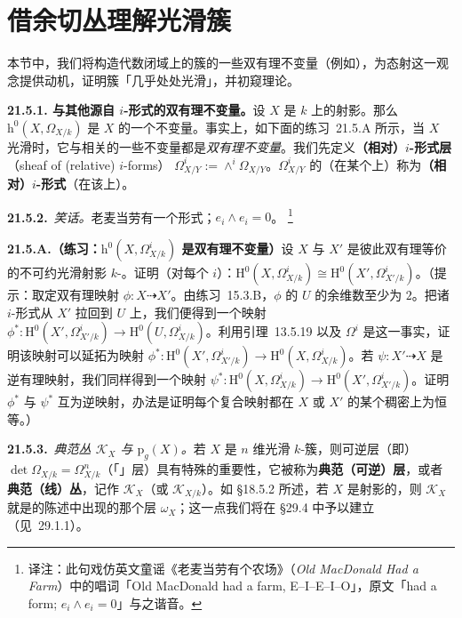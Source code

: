 
\section{借余切丛理解光滑簇}

本节中，我们将构造代数闭域上的簇的一些双有理不变量（例如\trGeometricGenus），为\trUnramified{}态射这一观念提供动机，证明簇「几乎处处光滑」，并初窥\trHodge{}理论。

\textbf{21.5.1. \trGeometricGenus{}与其他源自 $i$-形式的双有理不变量。}\quad 设 $X$ 是 $k$ 上的射影\trScheme。那么 $\mathrm{h}^0(X,\Omega_{X/k})$ 是 $X$ 的一个不变量。事实上，如下面的\mbox{练习~21.5.A} 所示，当 $X$ 光滑时，它与相关的一些不变量都是\emph{双有理不变量}。我们先定义\textbf{（相对）$i$-形式层}（sheaf of (relative) $i$-forms）%
$\Omega^i_{X/Y}:=\wedge^i\Omega_{X/Y}$。$\Omega^i_{X/Y}$ 的\trSection（在某个\trOpenSet{}上）称为\textbf{（相对）$i$-形式}（在该\trOpenSet{}上）。

\textbf{21.5.2.}\ \emph{笑话。}\quad 老麦当劳有一个形式；$e_i\wedge e_i=0$。%
\footnote{译注：此句戏仿英文童谣《老麦当劳有个农场》（\emph{Old MacDonald Had a Farm}）中的唱词「Old MacDonald had a farm, E--I--E--I--O」，原文「had a form; $e_i\wedge e_i=0$」与之谐音。}

\textbf{21.5.A.（练习：$\mathrm{h}^0(X,\Omega^i_{X/k})$ 是双有理不变量）}\quad 设 $X$ 与 $X'$ 是彼此双有理等价的不可约光滑射影 $k$-\trVariety。证明（对每个 $i$）：$\mathrm{H}^0(X,\Omega^i_{X/k})\cong\mathrm{H}^0(X',\Omega^i_{X'/k})$。（提示：取定双有理映射 $\phi\colon X\dashrightarrow X'$。由\mbox{练习~15.3.B}，$\phi$ 的\trDomainOfDefinition{} $U$ 的\trComplement{}余维数至少为 $2$。把诸 $i$-形式从 $X'$ 拉回到 $U$ 上，我们便得到一个映射 $\phi^*\colon\mathrm{H}^0(X',\Omega^i_{X'/k})\to\mathrm{H}^0(U,\Omega^i_{X/k})$。利用\mbox{\trAlgebraic\trHartogs{}引理~13.5.19} 以及 $\Omega^i$ 是\trLocallyFreeSheaf{}这一事实，证明该映射可以延拓为映射 $\phi^*\colon\mathrm{H}^0(X',\Omega^i_{X'/k})\to\mathrm{H}^0(X,\Omega^i_{X/k})$。若 $\psi\colon X'\dashrightarrow X$ 是逆有理映射，我们同样得到一个映射 $\psi^*\colon\mathrm{H}^0(X,\Omega^i_{X/k})\to\mathrm{H}^0(X',\Omega^i_{X'/k})$。证明 $\phi^*$ 与 $\psi^*$ 互为逆映射，办法是证明每个复合映射都在 $X$ 或 $X'$ 的某个稠密\trOpenSubset{}上为恒等。）

\textbf{21.5.3.}\ \emph{典范丛 $\mathscr{K}_X$ 与\trGeometricGenus{} $\mathrm{p}_g(X)$。}\quad 若 $X$ 是 $n$ 维光滑 $k$-簇，则可逆层（即\trLineBundle）$\det\Omega_{X/k}=\Omega^n_{X/k}$（「\trAlgebraicVolumeForm」层）具有特殊的重要性，它被称为\textbf{典范（可逆）层}，或者\textbf{典范（线）丛}，记作 $\mathscr{K}_X$（或 $\mathscr{K}_{X/k}$）。如 \S18.5.2 所述，若 $X$ 是射影的，则 $\mathscr{K}_X$ 就是\trSerreDuality{}的陈述中出现的那个\trCanonical{}层 $\omega_X$；这一点我们将在 \S29.4 中予以建立（见\mbox{\trDesideratum{}~29.1.1}）。

